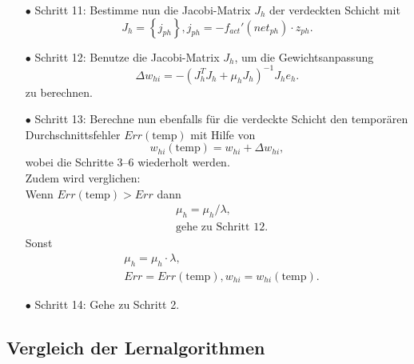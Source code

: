 \begin{itemize}
\item[\textbf{$\bullet$}] Schritt 11: Bestimme nun die Jacobi-Matrix $J_{h}$ der verdeckten Schicht mit
\begin{equation}
J_{h}= \left \{ j_{ph} \right \}, j_{ph}=-f_{act}'(net_{ph}) \cdot z_{ph}.
\end{equation}

\item[\textbf{$\bullet$}] Schritt 12: Benutze die Jacobi-Matrix $J_{h}$, um die Gewichtsanpassung 
\begin{equation}
\Delta w_{hi}=-(J_{h}^T J_{h} + \mu_{h} J_{h})^{-1} J_{h} e_{h}.
\end{equation}
zu berechnen.

\item[\textbf{$\bullet$}] Schritt 13: Berechne nun ebenfalls für die verdeckte Schicht den temporären Durchschnittsfehler $Err(\text{temp})$ mit Hilfe von
\begin{equation}
w_{hi}(\text{temp})= w_{hi} + \Delta w_{hi},
\end{equation}
wobei die Schritte 3--6 wiederholt werden.\\
Zudem wird verglichen:\\
Wenn $Err(\text{temp}) > Err$ dann
\begin{align*}
&\mu_h = \mu_h / \lambda, \\
&\text{gehe zu Schritt 12.}
\end{align*}
Sonst
\begin{align*}
&\mu_h = \mu_h \cdot \lambda, \\
&Err=Err(\text{temp}), w_{hi}=w_{hi}(\text{temp}).
\end{align*}

\item[\textbf{$\bullet$}] Schritt 14: Gehe zu Schritt 2.
\end{itemize}

\newpage

\subsection{Vergleich der Lernalgorithmen}\label{sec:vergleich_la}

